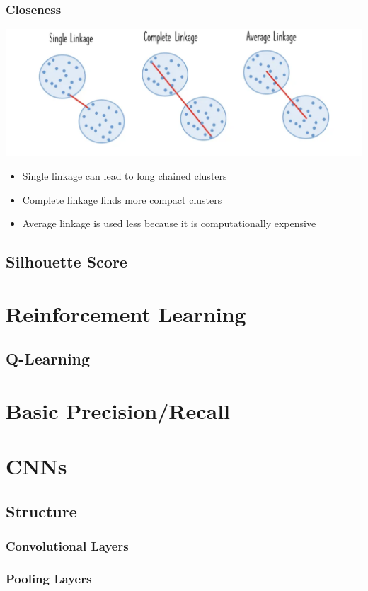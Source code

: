 \documentclass[10pt]{report}
\begin{document}
\subsection{Closeness}
\includegraphics[width=\textwidth]{images/linkage.png}
\begin{itemize}
  \item Single linkage can lead to long chained clusters
  \item Complete linkage finds more compact clusters
  \item Average linkage is used less because it is computationally expensive
\end{itemize}
\section{Silhouette Score}

\chapter{Reinforcement Learning}
\section{Q-Learning}

\chapter{Basic Precision/Recall}

\chapter{CNNs}
\section{Structure}
\subsection{Convolutional Layers}
\subsection{Pooling Layers}
\end{document}
